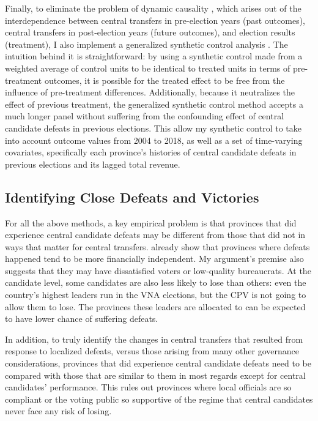 \documentclass[12pt]{article}
\newcommand{\1}{\mathbbm{1}}
\begin{document}
Finally, to eliminate the problem of dynamic causality \citep{ImaiKim2019}, which arises out of the interdependence between central transfers in pre-election years (past outcomes), central transfers in post-election years (future outcomes), and election results (treatment), I also implement a generalized synthetic control analysis \citep{Xu2017gsynth}. The intuition behind it is straightforward: by using a synthetic control made from a weighted average of control units to be identical to treated units in terms of pre-treatment outcomes, it is possible for the treated effect to be free from the influence of pre-treatment differences. Additionally, because it neutralizes the effect of previous treatment, the generalized synthetic control method accepts a much longer panel without suffering from the confounding effect of central candidate defeats in previous elections. This allow my synthetic control to take into account outcome values from 2004 to 2018, as well as a set of time-varying covariates, specifically each province's histories of central candidate defeats in previous elections and its lagged total revenue.

\subsection{Identifying Close Defeats and Victories}
\label{sec:methods_sample}

For all the above methods, a key empirical problem is that provinces that did experience central candidate defeats may be different from those that did not in ways that matter for central transfers. \citet{MaleskySchuler2011} already show that provinces where defeats happened tend to be more financially independent. My argument's premise also suggests that they may have dissatisfied voters or low-quality bureaucrats. At the candidate level, some candidates are also less likely to lose than others: even the country's highest leaders run in the VNA elections, but the CPV is not going to allow them to lose. The provinces these leaders are allocated to can be expected to have lower chance of suffering defeats. 

In addition, to truly identify the changes in central transfers that resulted from response to localized defeats, versus those arising from many other governance considerations, provinces that did experience central candidate defeats need to be compared with those that are similar to them in most regards except for central candidates' performance. This rules out provinces where local officials are so compliant or the voting public so supportive of the regime that central candidates never face any risk of losing.
\end{document}
